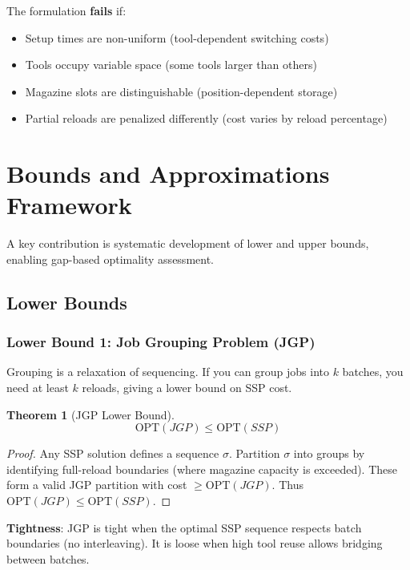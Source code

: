 \documentclass[12pt]{article}
\newtheorem{theorem}{Theorem}[section]
\begin{document}
	The formulation \textbf{fails} if:
	\begin{itemize}
		\item Setup times are non-uniform (tool-dependent switching costs)
		\item Tools occupy variable space (some tools larger than others)
		\item Magazine slots are distinguishable (position-dependent storage)
		\item Partial reloads are penalized differently (cost varies by reload percentage)
	\end{itemize}
	
	\section{Bounds and Approximations Framework}
	
	A key contribution is systematic development of lower and upper bounds, enabling gap-based optimality assessment.
	
	\subsection{Lower Bounds}
	
	\subsubsection{Lower Bound 1: Job Grouping Problem (JGP)}
	
	\begin{intuitionbox}
		Grouping is a relaxation of sequencing. If you can group jobs into $k$ batches, you need at least $k$ reloads, giving a lower bound on SSP cost.
	\end{intuitionbox}
	
	\begin{theorem}[JGP Lower Bound]
		\label{thm:jgp_lb}
		$$\text{OPT}(JGP) \le \text{OPT}(SSP)$$
	\end{theorem}
	\begin{proof}
		Any SSP solution defines a sequence $\sigma$. Partition $\sigma$ into groups by identifying full-reload boundaries (where magazine capacity is exceeded). These form a valid JGP partition with cost $\ge \text{OPT}(JGP)$. Thus $\text{OPT}(JGP) \le \text{OPT}(SSP)$.
	\end{proof}
	
	\textbf{Tightness}: JGP is tight when the optimal SSP sequence respects batch boundaries (no interleaving). It is loose when high tool reuse allows bridging between batches.
	
\end{document}
